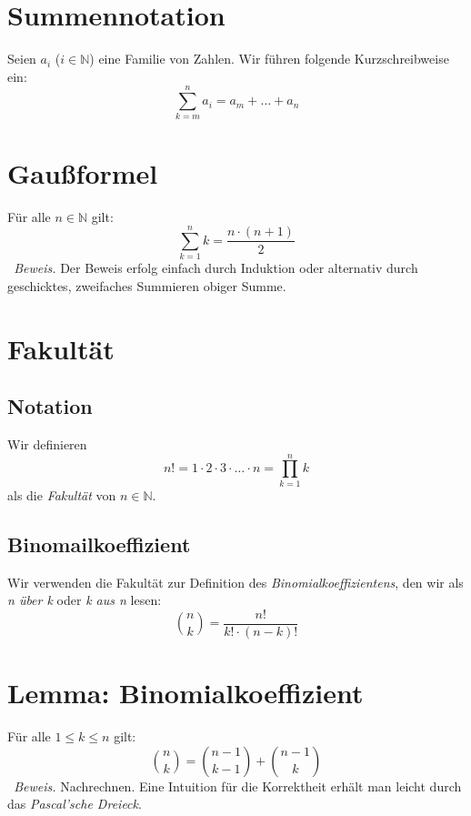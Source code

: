 \documentclass{scrreprt}
\newenvironment{proof}{\emph{\ Beweis.}}{}
\newcommand{\NN}{\mathbb{N}}
\begin{document}
	\section{Summennotation}
	Seien $a_i$ ($i \in \NN$) eine Familie von Zahlen. Wir führen folgende Kurzschreibweise ein:
	\begin{equation*}
		\sum\limits_{k=m}^n a_i = a_m + \dots + a_n
	\end{equation*}

	\section{Gaußformel}
	Für alle $n \in \NN$ gilt: 
	\begin{equation*}
			\sum\limits_{k=1}^n k = \frac{n \cdot (n + 1)}{2}
	\end{equation*}
	\begin{proof}
		Der Beweis erfolg einfach durch Induktion oder alternativ durch geschicktes, zweifaches Summieren obiger Summe.  
	\end{proof}

	\section{Fakultät}
		\subsection{Notation}
		Wir definieren
		\begin{equation*}
			n ! = 1 \cdot 2 \cdot 3 \cdot \dots \cdot n = \prod\limits_{k=1}^n k 
		\end{equation*}
		als die \emph{Fakultät} von $n \in \NN$.
		\subsection{Binomailkoeffizient}
		Wir verwenden die Fakultät zur Definition des \emph{Binomialkoeffizientens}, den wir als \emph{n über k} oder \emph{k aus n} lesen:
		\begin{equation*} 
			\binom{n}{k} = \frac{n!}{k! \cdot (n-k)!}
		\end{equation*}

	\section{Lemma: Binomialkoeffizient}
	Für alle $1 \leq k \leq n$ gilt:
	\begin{equation*}
		\binom{n}{k} = \binom{n-1}{k-1} + \binom{n-1}{k}
	\end{equation*}
	\begin{proof}
		Nachrechnen. Eine Intuition für die Korrektheit erhält man leicht durch das \emph{Pascal'sche Dreieck}.
	\end{proof}
\end{document}
